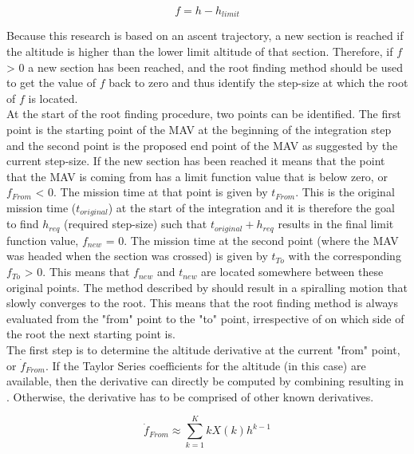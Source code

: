 \begin{equation} \label{eq:limitFunction}
f = h-h_{limit}
\end{equation}


\noindent
Because this research is based on an ascent trajectory, a new section is reached if the altitude is higher than the lower limit altitude of that section. Therefore, if $f$ > 0 a new section has been reached, and the root finding method should be used to get the value of $f$ back to zero and thus identify the step-size at which the root of $f$ is located.\\

\noindent
At the start of the root finding procedure, two points can be identified. The first point is the starting point of the \ac{MAV} at the beginning of the integration step and the second point is the proposed end point of the \ac{MAV} as suggested by the current step-size. If the new section has been reached it means that the point that the \ac{MAV} is coming from has a limit function value that is below zero, or $f_{From}$ < 0. The mission time at that point is given by $t_{From}$. This is the original mission time ($t_{original}$) at the start of the integration and it is therefore the goal to find $h_{req}$ (required step-size) such that $t_{original}+h_{req}$ results in the final limit function value, $f_{new}$ = 0. The mission time at the second point (where the \ac{MAV} was headed when the section was crossed) is given by $t_{To}$ with the corresponding $f_{To}$ > 0. This means that $f_{new}$ and $t_{new}$ are located somewhere between these original points. The method described by \cite{bergsma2015application} should result in a spiralling motion that slowly converges to the root. This means that the root finding method is always evaluated from the "from" point to the "to" point, irrespective of on which side of the root the next starting point is. \\

\noindent
The first step is to determine the altitude derivative at the current "from" point, or $\dot{f}_{From}$. If the Taylor Series coefficients for the altitude (in this case) are available, then the derivative can directly be computed by combining  resulting in . Otherwise, the derivative has to be comprised of other known derivatives.

\begin{equation}\label{eq:fFromDot}
\dot{f}_{From} \approx \displaystyle\sum_{k=1}^{K}kX\left(k\right) h^{k-1}
\end{equation}

